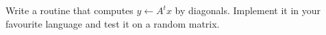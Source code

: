   Write a routine that computes $y\leftarrow A^tx$ by
  diagonals. Implement it in your favourite language and test it on a
  random matrix.
